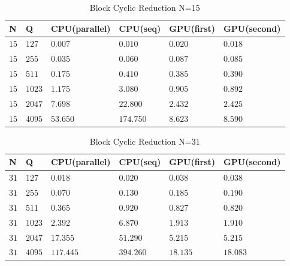    \begin{table}[H]
\caption{Block Cyclic Reduction N=15} 
\centering 
\begin{tabular}{| l |  p{1cm} |p{}| p{} |  p{}| p{}  |} 
\hline\hline 
N & Q & CPU(parallel) & CPU(seq) & GPU(first)  & GPU(second) \\ [0.8ex] 
\hline
$15$ &	$127$ & $0.007$	&	$0.010$ & $0.020$ & $0.018$ \\
$15$ &	$255$ & $0.035$	&	$0.060$ & $0.087$ & $0.085$ \\
$15$ &	$511$ & $0.175$	&	$0.410$ & $0.385$ & $0.390$ \\
$15$ &	$1023$ & $1.175$	& $3.080$  & $0.905$ & $0.892$ \\
$15$ &	$2047$ & $7.698$	&	$22.800$ & $2.432$ & $2.425$ \\
$15$ &  $4095$ & $53.650$	&	$174.750$ & $8.623$ &  $8.590$ \\[1ex]
\hline 
\end{tabular}
\label{table:bcr_n=15} 
\end{table}

   \begin{table}[H]
\caption{Block Cyclic Reduction N=31} 
\centering 
\begin{tabular}{| l |  p{1cm} |p{}| p{} |  p{}| p{} |} 
\hline\hline 
N & Q & CPU(parallel) & CPU(seq) & GPU(first)  & GPU(second) \\ [0.8ex] 
\hline
$31$ &	$127$ & $0.018$	&	$0.020$ & $0.038$ & $0.038$ \\
$31$ &	$255$ &	$0.070$	& $0.130$ & $0.185$ & $0.190$ \\
$31$ &	$511$ &	$0.365$	& $0.920$ & $0.827$ & $0.820$ \\
$31$ &	$1023$ &	$2.392$	& $6.870$ & $1.913$ & $1.910$ \\
$31$ &	$2047$ & $17.355$	&	$51.290$  & $5.215$ & $5.215$ \\
$31$ &	$4095$ & $117.445$	&	$394.260$ & $18.135$ & $18.083$ \\ [1ex]
\hline 
\end{tabular}
\label{table:bcr_n=31} 
\end{table}


